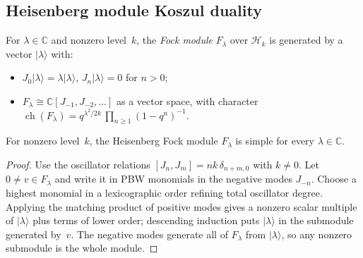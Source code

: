 \subsection{Heisenberg module Koszul duality}

\begin{definition}\label{def:fock-module}
For $\lambda \in \mathbb{C}$ and nonzero level~$k$, the \emph{Fock module}
$F_\lambda$ over $\mathcal{H}_k$ is generated by a vector
$|\lambda\rangle$ with:
\begin{itemize}
\item $J_0|\lambda\rangle = \lambda|\lambda\rangle$,\quad
 $J_n|\lambda\rangle = 0$ for $n > 0$;
\item $F_\lambda \cong \mathbb{C}[J_{-1}, J_{-2}, \ldots]$ as a
 vector space, with character
  $\operatorname{ch}(F_\lambda) = q^{\lambda^2/2k}\,
  \prod_{n \geq 1}(1-q^n)^{-1}$.
\end{itemize}
\end{definition}

\begin{lemma}
\label{lem:fock-module-simplicity}
For nonzero level~$k$, the Heisenberg Fock module $F_\lambda$ is simple
for every $\lambda\in\mathbb C$.
\end{lemma}

\begin{proof}
Use the oscillator relations
$[J_n,J_m]=n k\,\delta_{n+m,0}$ with $k\neq0$.
Let $0\neq v\in F_\lambda$ and write it in PBW monomials in the negative
modes $J_{-n}$. Choose a highest monomial in a lexicographic order
refining total oscillator degree. Applying the matching product of
positive modes gives a nonzero scalar multiple of $|\lambda\rangle$ plus
terms of lower order; descending induction puts $|\lambda\rangle$ in
the submodule generated by~$v$. The negative modes generate all of
$F_\lambda$ from $|\lambda\rangle$, so any nonzero submodule is the
whole module.
\end{proof}


